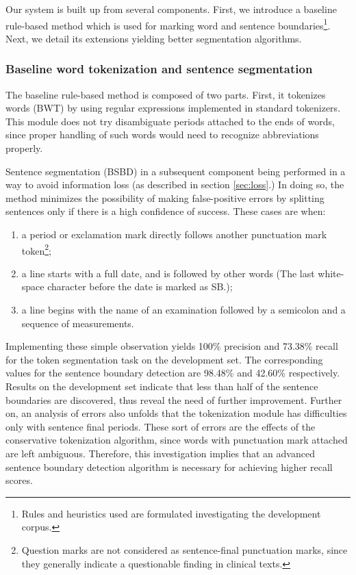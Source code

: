 Our system is built up from several components. 
First, we introduce a baseline rule-based method which is used for marking word and sentence boundaries\footnote{Rules and heuristics used are formulated investigating the development corpus.}. 
Next, we detail its extensions yielding better segmentation algorithms. %

\subsubsection{Baseline word tokenization and sentence segmentation}

The baseline rule-based method is composed of two parts. First, it tokenizes words (BWT) by using regular expressions implemented in standard tokenizers. This module does not try disambiguate periods attached to the ends of words, since proper handling of such words would need to recognize abbreviations properly. 

Sentence segmentation (BSBD) in a subsequent component being performed in a way to avoid information loss (as described in section \ref{sec:loss}.) 
In doing so, the method minimizes the possibility of making false-positive errors by splitting sentences only if there is a high confidence of success. 
These cases are when:
\begin{enumerate} 
 \item a period or exclamation mark directly follows another punctuation mark token\footnote{Question marks are not considered as sentence-final punctuation marks, since they generally indicate a questionable finding in clinical texts.};
 \item a line starts with a full date, and is followed by other words (The last white-space character before the date is marked as SB.);
 \item a line begins with the name of an examination followed by a semicolon and a sequence of measurements.
\end{enumerate}

Implementing these simple observation yields 100\% precision and 73.38\% recall for the token segmentation task on the development set. The corresponding values for the sentence boundary detection are 98.48\% and 42.60\% respectively. 
Results on the development set indicate that less than half of the sentence boundaries are discovered, thus reveal the need of further improvement.
Further on, an analysis of errors also unfolds that the tokenization module has difficulties only with sentence final periods. These sort of errors are the effects of the conservative tokenization algorithm, since words with punctuation mark attached are left ambiguous.
Therefore, this investigation implies that an advanced sentence boundary detection algorithm is necessary for achieving higher recall scores.

